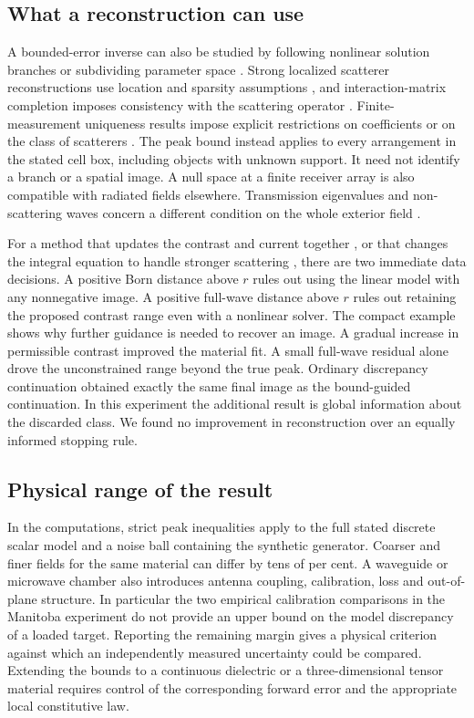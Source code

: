 \documentclass[anonymous,12pt]{iopjournal}
\numberwithin{equation}{section}
\begin{document}
\subsection{What a reconstruction can use}
A bounded-error inverse can also be studied by following nonlinear solution branches \cite{everett96,everett26,vasco} or subdividing parameter space \cite{sivia}. Strong localized scatterer reconstructions use location and sparsity assumptions \cite{chai}, and interaction-matrix completion imposes consistency with the scattering operator \cite{levinson}. Finite-measurement uniqueness results impose explicit restrictions on coefficients or on the class of scatterers \cite{alberti19,alberti21,kuo_novikov}. The peak bound instead applies to every arrangement in the stated cell box, including objects with unknown support. It need not identify a branch or a spatial image. A null space at a finite receiver array is also compatible with radiated fields elsewhere. Transmission eigenvalues and non-scattering waves concern a different condition on the whole exterior field \cite{cakoni_book,cakoni_vogelius}.

For a method that updates the contrast and current together \cite{csi}, or that changes the integral equation to handle stronger scattering \cite{nie,cie}, there are two immediate data decisions. A positive Born distance above $r$ rules out using the linear model with any nonnegative image. A positive full-wave distance above $r$ rules out retaining the proposed contrast range even with a nonlinear solver. The compact example shows why further guidance is needed to recover an image. A gradual increase in permissible contrast improved the material fit. A small full-wave residual alone drove the unconstrained range beyond the true peak. Ordinary discrepancy continuation obtained exactly the same final image as the bound-guided continuation. In this experiment the additional result is global information about the discarded class. We found no improvement in reconstruction over an equally informed stopping rule.

\subsection{Physical range of the result}
In the computations, strict peak inequalities apply to the full stated discrete scalar model and a noise ball containing the synthetic generator. Coarser and finer fields for the same material can differ by tens of per cent. A waveguide or microwave chamber also introduces antenna coupling, calibration, loss and out-of-plane structure. In particular the two empirical calibration comparisons in the Manitoba experiment do not provide an upper bound on the model discrepancy of a loaded target. Reporting the remaining margin gives a physical criterion against which an independently measured uncertainty could be compared. Extending the bounds to a continuous dielectric or a three-dimensional tensor material requires control of the corresponding forward error and the appropriate local constitutive law.
\end{document}
